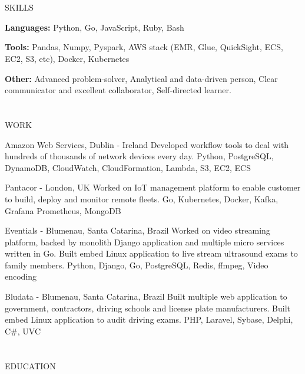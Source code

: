 \documentclass{my_cv}
\begin{document}
\begin{multicols}{2}

\section{\faList}{SKILLS}

\textbf{Languages:} Python, Go, JavaScript, Ruby, Bash

\noindent\textbf{Tools:} Pandas, Numpy, Pyspark, AWS stack (EMR, Glue, QuickSight, ECS, EC2, S3, etc), Docker, Kubernetes

\noindent\textbf{Other:} Advanced problem-solver, Analytical and data-driven person, Clear communicator and excellent collaborator, Self-directed learner.

\section{\faPencil}{WORK}

%
    {Amazon Web Services, Dublin - Ireland}%
    {Developed workflow tools to deal with hundreds of thousands of network devices every day.}
    {Python, PostgreSQL, DynamoDB, CloudWatch, CloudFormation, Lambda, S3, EC2, ECS}

%
    {Pantacor - London, UK}%
    {Worked on IoT management platform to enable customer to build, deploy and monitor remote fleets.}%
    {Go, Kubernetes, Docker, Kafka, Grafana Prometheus, MongoDB}

%
    {Eventials - Blumenau, Santa Catarina, Brazil}%
    {Worked on video streaming platform, backed by monolith Django application and multiple micro services written in Go. Built embed Linux application to live stream ultrasound exams to family members.}%
    {Python, Django, Go, PostgreSQL, Redis, ffmpeg, Video encoding}

%
    {Bludata - Blumenau, Santa Catarina, Brazil}%
    {Built multiple web application to government, contractors, driving schools and license plate manufacturers. Built embed Linux application to audit driving exams.}%
    {PHP, Laravel, Sybase, Delphi, C\#, UVC}%

\columnbreak

\section{\faGraduationCap}{EDUCATION}


\end{multicols}
\end{document}

